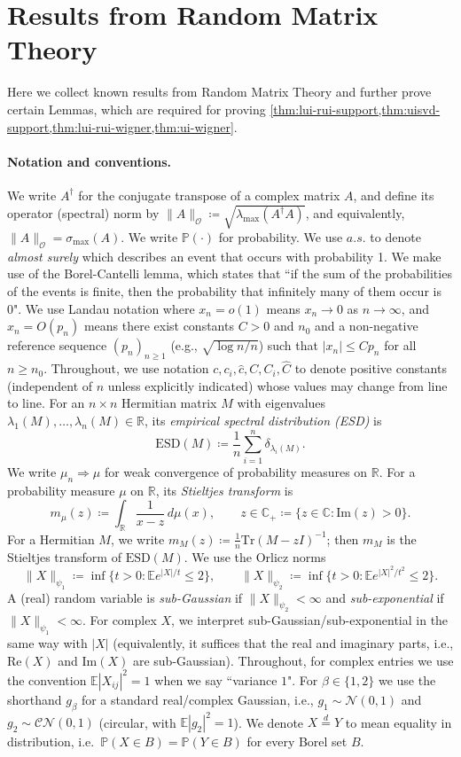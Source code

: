 \documentclass[11pt,a4paper]{article}
\newcommand{\be}{\begin{equation}}
\newcommand{\ee}{\end{equation}}
\newcommand{\op}{\mathcal{O}}
\newcommand{\Prob}{\mathbb{P}}
\begin{document}
\section{Results from Random Matrix Theory}\label{sec:tools}
Here we collect known results from Random Matrix Theory and further prove certain Lemmas, which are required for proving \cref{thm:lui-rui-support,thm:uisvd-support,thm:lui-rui-wigner,thm:ui-wigner}.
\paragraph{Notation and conventions.} We write $A^\dagger$ for the conjugate transpose of a complex matrix $A$, and define its operator (spectral) norm by \( \|A\|_{\op} \coloneq \sqrt{\lambda_{\max}(A^\dagger A)}\), and equivalently, $\|A\|_{\op}=\sigma_{\max}(A)$. We write $\Prob(\cdot)$ for probability. We use $a.s.$ to denote \textit{almost surely} which describes an event that occurs with probability 1. We make use of the Borel-Cantelli lemma, which states that ``if the sum of the probabilities of the events is finite, then the probability that infinitely many of them occur is 0". We use Landau notation where $x_n=o(1)$ means $x_n\to0$ as $n\to\infty$, and $x_n=O(p_n)$ means there exist constants $C>0$ and $n_0$ and a non-negative reference sequence $(p_n)_{n\ge1}$ (e.g., $\sqrt{\log n/n}$) such that $|x_n|\le C p_n$ for all $n\ge n_0$. Throughout, we use notation $c,c_i,\hat c,C,C_i,\hat C$ to denote positive constants (independent of $n$ unless explicitly indicated) whose values may change from line to line. For an $n\times n$ Hermitian matrix $M$ with eigenvalues $\lambda_1(M),\dots,\lambda_n(M)\in\mathbb R$, its \emph{empirical spectral distribution (ESD)} is
\be
\mathrm{ESD}(M)\coloneq \frac1n\sum_{i=1}^n \delta_{\lambda_i(M)}.
\ee
We write $\mu_n \Rightarrow \mu$ for weak convergence of probability measures on $\mathbb R$. For a probability measure $\mu$ on $\mathbb R$, its \emph{Stieltjes transform} is
\be
m_\mu(z)\coloneq \int_{\mathbb R}\frac{1}{x-z}\,d\mu(x),\qquad z\in\mathbb C_+\coloneq \{z\in\mathbb C:\mathrm{Im}(z)>0\}.
\ee
For a Hermitian $M$, we write $m_M(z)\coloneq \frac1n\mathrm{Tr}(M-zI)^{-1}$; then $m_M$ is the Stieltjes transform of $\mathrm{ESD}(M)$. We use the Orlicz norms
\be
\|X\|_{\psi_1}\coloneq \inf\{t>0:\mathbb E e^{|X|/t}\le 2\},\qquad
\|X\|_{\psi_2}\coloneq \inf\{t>0:\mathbb E e^{|X|^2/t^2}\le 2\}.
\ee
A (real) random variable is \emph{sub-Gaussian} if $\|X\|_{\psi_2}<\infty$ and \emph{sub-exponential} if $\|X\|_{\psi_1}<\infty$. For complex $X$, we interpret sub-Gaussian/sub-exponential in the same way with $|X|$ (equivalently, it suffices that the real and imaginary parts, i.e., $\mathrm{Re}(X)$ and $\mathrm{Im}(X)$ are sub-Gaussian). Throughout, for complex entries we use the convention $\mathbb E|X_{ij}|^2=1$ when we say ``variance $1$".  For $\beta\in\{1,2\}$ we use the shorthand $g_\beta$ for a standard real/complex Gaussian, i.e., $g_1\sim\mathcal N(0,1)$ and $g_2\sim\mathcal{CN}(0,1)$ (circular, with $\mathbb E|g_2|^2=1$). We denote $X\stackrel{d}{=}Y$ to mean equality in distribution, i.e.\ $\Prob(X\in B)=\Prob(Y\in B)$ for every Borel set $B$. 
\end{document}
